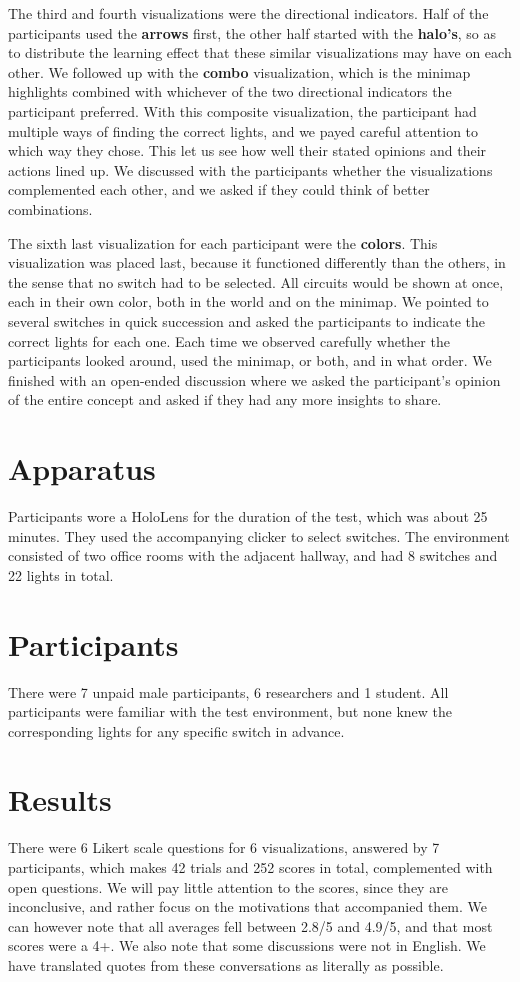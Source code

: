 The third and fourth visualizations were the directional indicators. Half of the participants used the \textbf{arrows} first, the other half started with the \textbf{halo's}, so as to distribute the learning effect that these similar visualizations may have on each other. We followed up with the \textbf{combo} visualization, which is the minimap highlights combined with whichever of the two directional indicators the participant preferred. With this composite visualization, the participant had multiple ways of finding the correct lights, and we payed careful attention to which way they chose. This let us see how well their stated opinions and their actions lined up. We discussed with the participants whether the visualizations complemented each other, and we asked if they could think of better combinations.

The sixth last visualization for each participant were the \textbf{colors}. This visualization was placed last, because it functioned differently than the others, in the sense that no switch had to be selected. All circuits would be shown at once, each in their own color, both in the world and on the minimap. We pointed to several switches in quick succession and asked the participants to indicate the correct lights for each one. Each time we observed carefully whether the participants looked around, used the minimap, or both, and in what order. We finished with an open-ended discussion where we asked the participant's opinion of the entire concept and asked if they had any more insights to share.

\section{Apparatus} \label{sec:user:survey:apparatus}
Participants wore a HoloLens for the duration of the test, which was about 25 minutes. They used the accompanying clicker to select switches. The environment consisted of two office rooms with the adjacent hallway, and had 8 switches and 22 lights in total.

\section{Participants} \label{sec:user:survey:participants}
There were 7 unpaid male participants, 6 researchers and 1 student. All participants were familiar with the test environment, but none knew the corresponding lights for any specific switch in advance.

\section{Results} \label{sec:user:results}
There were 6 Likert scale questions for 6 visualizations, answered by 7 participants, which makes 42 trials and 252 scores in total, complemented with open questions. We will pay little attention to the scores, since they are inconclusive, and rather focus on the motivations that accompanied them. We can however note that all averages fell between 2.8/5 and 4.9/5, and that most scores were a 4+. We also note that some discussions were not in English. We have translated quotes from these conversations as literally as possible.

